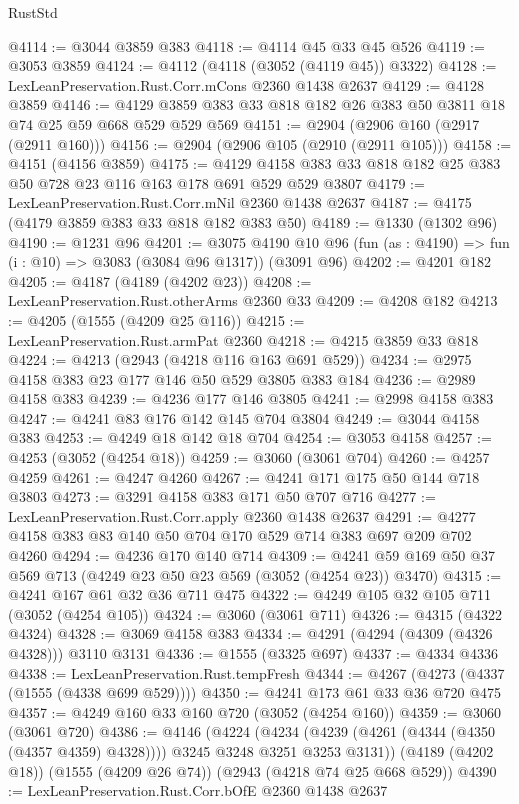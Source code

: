 \begin{lexlean}{RustStd}
\begin{coremodule}
@4114 := @3044 @3859 @383
@4118 := @4114 @45 @33 @45 @526
@4119 := @3053 @3859
@4124 := @4112 (@4118 (@3052 (@4119 @45)) @3322)
@4128 := LexLeanPreservation.Rust.Corr.mCons @2360 @1438 @2637
@4129 := @4128 @3859
@4146 := @4129 @3859 @383 @33 @818 @182 @26 @383 @50 @3811 @18 @74 @25 @59 @668 @529 @529 @569
@4151 := @2904 (@2906 @160 (@2917 (@2911 @160)))
@4156 := @2904 (@2906 @105 (@2910 (@2911 @105)))
@4158 := @4151 (@4156 @3859)
@4175 := @4129 @4158 @383 @33 @818 @182 @25 @383 @50 @728 @23 @116 @163 @178 @691 @529 @529 @3807
@4179 := LexLeanPreservation.Rust.Corr.mNil @2360 @1438 @2637
@4187 := @4175 (@4179 @3859 @383 @33 @818 @182 @383 @50)
@4189 := @1330 (@1302 @96)
@4190 := @1231 @96
@4201 := @3075
    @4190
    @10
    @96
    (fun (as : @4190) => fun (i : @10) => @3083 (@3084 @96 @1317))
    (@3091 @96)
@4202 := @4201 @182
@4205 := @4187 (@4189 (@4202 @23))
@4208 := LexLeanPreservation.Rust.otherArms @2360 @33
@4209 := @4208 @182
@4213 := @4205 (@1555 (@4209 @25 @116))
@4215 := LexLeanPreservation.Rust.armPat @2360
@4218 := @4215 @3859 @33 @818
@4224 := @4213 (@2943 (@4218 @116 @163 @691 @529))
@4234 := @2975 @4158 @383 @23 @177 @146 @50 @529 @3805 @383 @184
@4236 := @2989 @4158 @383
@4239 := @4236 @177 @146 @3805
@4241 := @2998 @4158 @383
@4247 := @4241 @83 @176 @142 @145 @704 @3804
@4249 := @3044 @4158 @383
@4253 := @4249 @18 @142 @18 @704
@4254 := @3053 @4158
@4257 := @4253 (@3052 (@4254 @18))
@4259 := @3060 (@3061 @704)
@4260 := @4257 @4259
@4261 := @4247 @4260
@4267 := @4241 @171 @175 @50 @144 @718 @3803
@4273 := @3291 @4158 @383 @171 @50 @707 @716
@4277 := LexLeanPreservation.Rust.Corr.apply @2360 @1438 @2637
@4291 := @4277 @4158 @383 @83 @140 @50 @704 @170 @529 @714 @383 @697 @209 @702 @4260
@4294 := @4236 @170 @140 @714
@4309 := @4241 @59 @169 @50 @37 @569 @713 (@4249 @23 @50 @23 @569 (@3052 (@4254 @23)) @3470)
@4315 := @4241 @167 @61 @32 @36 @711 @475
@4322 := @4249 @105 @32 @105 @711 (@3052 (@4254 @105))
@4324 := @3060 (@3061 @711)
@4326 := @4315 (@4322 @4324)
@4328 := @3069 @4158 @383
@4334 := @4291 (@4294 (@4309 (@4326 @4328))) @3110 @3131
@4336 := @1555 (@3325 @697)
@4337 := @4334 @4336
@4338 := LexLeanPreservation.Rust.tempFresh
@4344 := @4267 (@4273 (@4337 (@1555 (@4338 @699 @529))))
@4350 := @4241 @173 @61 @33 @36 @720 @475
@4357 := @4249 @160 @33 @160 @720 (@3052 (@4254 @160))
@4359 := @3060 (@3061 @720)
@4386 := @4146
    (@4224
      (@4234 (@4239 (@4261 (@4344 (@4350 (@4357 @4359) @4328)))) @3245 @3248 @3251 @3253 @3131))
    (@4189 (@4202 @18))
    (@1555 (@4209 @26 @74))
    (@2943 (@4218 @74 @25 @668 @529))
@4390 := LexLeanPreservation.Rust.Corr.bOfE @2360 @1438 @2637

\end{coremodule}
\end{lexlean}
